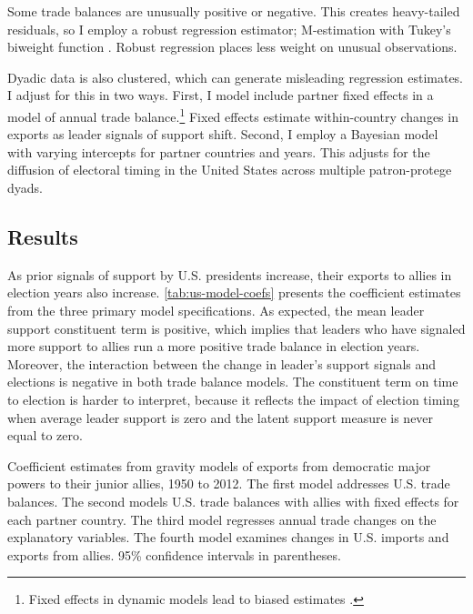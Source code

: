 \documentclass[12pt]{article}
\begin{document}
Some trade balances are unusually positive or negative. 
This creates heavy-tailed residuals, so I employ a robust regression estimator; M-estimation with Tukey's biweight function \citep{RaineyBaissa2020}.
Robust regression places less weight on unusual observations. 


Dyadic data is also clustered, which can generate misleading regression estimates.
I adjust for this in two ways. 
First, I model include partner fixed effects in a model of annual trade balance.\footnote{Fixed effects in dynamic models lead to biased estimates \citep{Nickell1981}.}
Fixed effects estimate within-country changes in exports as leader signals of support shift.
Second, I employ a Bayesian model with varying intercepts for partner countries and years. 
This adjusts for the diffusion of electoral timing in the United States across multiple patron-protege dyads.




\subsection{Results}


As prior signals of support by U.S. presidents increase, their exports to allies in election years also increase. 
\autoref{tab:us-model-coefs} presents the coefficient estimates from the three primary model specifications.
As expected, the mean leader support constituent term is positive, which implies that leaders who have signaled more support to allies run a more positive trade balance in election years. 
Moreover, the interaction between the change in leader's support signals and elections is negative in both trade balance models.
The constituent term on time to election is harder to interpret, because it reflects the impact of election timing when average leader support is zero and the latent support measure is never equal to zero. 


\begin{table}
  \resizebox{.95\textwidth}{!}{
\centering

}
\caption{Coefficient estimates from gravity models of exports from democratic major powers to their junior allies, 1950 to 2012. The first model addresses U.S. trade balances. The second models U.S. trade balances with allies with fixed effects for each partner country. The third model regresses annual trade changes on the explanatory variables. The fourth model examines changes in U.S. imports and exports from allies. 95\% confidence intervals in parentheses.}
\label{tab:us-model-coefs}
\end{table}
\end{document}
